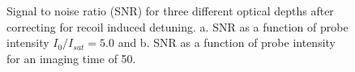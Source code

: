 \documentclass[12pt]{iopart}
\begin{document}
\begin{figure}
\caption{Signal to noise ratio (SNR) for three different optical depths after correcting for recoil induced detuning. a. SNR as a function of probe intensity $I_0/I_{sat}=5.0$ and b. SNR as a function of probe intensity for an imaging time of 50\us{}.}  
\label{fig:SNR}
\end{figure}
\end{document}
